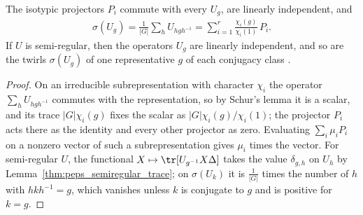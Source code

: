 \begin{lemma}%
    \label{lem:peps_twirled_representation}
    \leanok
    The isotypic projectors $P_i$ commute with every $U_g$, are linearly
    independent, and
    \begin{align*}
        \sigma(U_g)=\frac{1}{|G|}\sum_hU_{hgh^{-1}}
        =\sum_{i=1}^{r}\frac{\chi_i(g)}{\chi_i(1)}\,P_i .
    \end{align*}
    If $U$ is semi-regular, then the operators $U_g$ are linearly independent,
    and so are the twirls $\sigma(U_g)$ of one representative $g$ of each
    conjugacy class \cite[Section~``Parent Hamiltonians'']{Schuch2010PEPS}.
\end{lemma}

\begin{proof}\leanok
    On an irreducible subrepresentation with character $\chi_i$ the operator
    $\sum_hU_{hgh^{-1}}$ commutes with the representation, so by Schur's lemma
    it is a scalar, and its trace $|G|\chi_i(g)$ fixes the scalar as
    $|G|\chi_i(g)/\chi_i(1)$; the projector $P_i$ acts there as the identity
    and every other projector as zero. Evaluating $\sum_i\mu_iP_i$ on a nonzero
    vector of such a subrepresentation gives $\mu_i$ times the vector. For
    semi-regular $U$, the functional $X\mapsto\tr[U_{g^{-1}}X\Delta]$ takes the
    value $\delta_{g,h}$ on $U_h$ by
    Lemma~\ref{thm:peps_semiregular_trace}; on $\sigma(U_k)$ it is
    $\frac{1}{|G|}$ times the number of $h$ with $hkh^{-1}=g$, which vanishes
    unless $k$ is conjugate to $g$ and is positive for $k=g$.
\end{proof}


